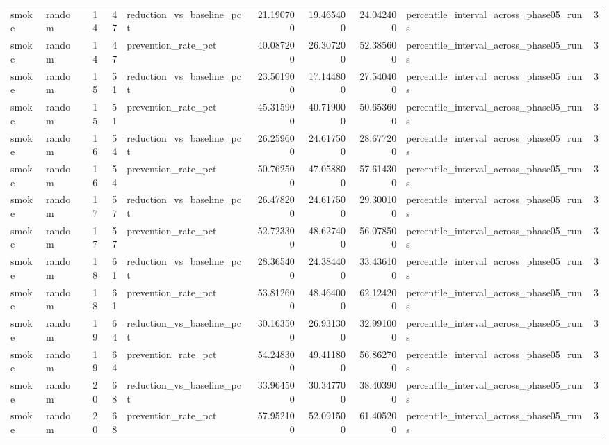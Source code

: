 \begin{tabular}{llrrlrrrlr}
smoke & random & 14 & 47 & reduction\_vs\_baseline\_pct & 21.190700 & 19.465400 & 24.042400 & percentile\_interval\_across\_phase05\_runs & 3 \\
smoke & random & 14 & 47 & prevention\_rate\_pct & 40.087200 & 26.307200 & 52.385600 & percentile\_interval\_across\_phase05\_runs & 3 \\
smoke & random & 15 & 51 & reduction\_vs\_baseline\_pct & 23.501900 & 17.144800 & 27.540400 & percentile\_interval\_across\_phase05\_runs & 3 \\
smoke & random & 15 & 51 & prevention\_rate\_pct & 45.315900 & 40.719000 & 50.653600 & percentile\_interval\_across\_phase05\_runs & 3 \\
smoke & random & 16 & 54 & reduction\_vs\_baseline\_pct & 26.259600 & 24.617500 & 28.677200 & percentile\_interval\_across\_phase05\_runs & 3 \\
smoke & random & 16 & 54 & prevention\_rate\_pct & 50.762500 & 47.058800 & 57.614300 & percentile\_interval\_across\_phase05\_runs & 3 \\
smoke & random & 17 & 57 & reduction\_vs\_baseline\_pct & 26.478200 & 24.617500 & 29.300100 & percentile\_interval\_across\_phase05\_runs & 3 \\
smoke & random & 17 & 57 & prevention\_rate\_pct & 52.723300 & 48.627400 & 56.078500 & percentile\_interval\_across\_phase05\_runs & 3 \\
smoke & random & 18 & 61 & reduction\_vs\_baseline\_pct & 28.365400 & 24.384400 & 33.436100 & percentile\_interval\_across\_phase05\_runs & 3 \\
smoke & random & 18 & 61 & prevention\_rate\_pct & 53.812600 & 48.464000 & 62.124200 & percentile\_interval\_across\_phase05\_runs & 3 \\
smoke & random & 19 & 64 & reduction\_vs\_baseline\_pct & 30.163500 & 26.931300 & 32.991000 & percentile\_interval\_across\_phase05\_runs & 3 \\
smoke & random & 19 & 64 & prevention\_rate\_pct & 54.248300 & 49.411800 & 56.862700 & percentile\_interval\_across\_phase05\_runs & 3 \\
smoke & random & 20 & 68 & reduction\_vs\_baseline\_pct & 33.964500 & 30.347700 & 38.403900 & percentile\_interval\_across\_phase05\_runs & 3 \\
smoke & random & 20 & 68 & prevention\_rate\_pct & 57.952100 & 52.091500 & 61.405200 & percentile\_interval\_across\_phase05\_runs & 3 \\
\bottomrule
\end{tabular}
